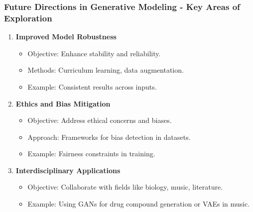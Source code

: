 \documentclass[aspectratio=169]{beamer}
\begin{document}
\begin{frame}[fragile]
    \frametitle{Future Directions in Generative Modeling - Key Areas of Exploration}
    \begin{enumerate}
        \item \textbf{Improved Model Robustness}
            \begin{itemize}
                \item Objective: Enhance stability and reliability.
                \item Methods: Curriculum learning, data augmentation.
                \item Example: Consistent results across inputs.
            \end{itemize}

        \item \textbf{Ethics and Bias Mitigation}
            \begin{itemize}
                \item Objective: Address ethical concerns and biases.
                \item Approach: Frameworks for bias detection in datasets.
                \item Example: Fairness constraints in training. 
            \end{itemize}
      
        \item \textbf{Interdisciplinary Applications}
            \begin{itemize}
                \item Objective: Collaborate with fields like biology, music, literature.
                \item Example: Using GANs for drug compound generation or VAEs in music.
            \end{itemize}
    \end{enumerate}
\end{frame}
\end{document}
